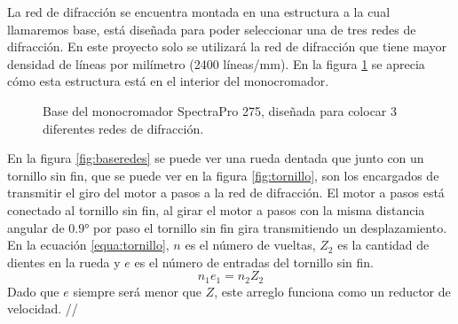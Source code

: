 La red de difracción se encuentra montada en una estructura a la cual llamaremos base, está diseñada para poder seleccionar una de tres redes de difracción. En este proyecto solo se utilizará la red de difracción que tiene mayor densidad de líneas por milímetro (2400 líneas/mm). En la figura \ref{fig:basered2} se aprecia cómo esta estructura está en el interior del monocromador.
\begin{figure}[h]
	\centering
	\caption{Base del monocromador SpectraPro 275, diseñada para colocar 3 diferentes redes de difracción.}
	\label{fig:basered2}
\end{figure}

En la figura \ref{fig:baseredes} se puede ver una rueda dentada que junto con un tornillo sin fin, que se puede ver en la figura \ref{fig:tornillo}, son los encargados de transmitir el giro del motor a pasos a la red de difracción. 
El motor a pasos está conectado al tornillo sin fin, al girar el motor a pasos con la misma distancia angular de $0.9°$ por paso el tornillo sin fin gira transmitiendo un desplazamiento. En la ecuación \ref{equa:tornillo}, $n$ es el número de vueltas, $Z_2$ es la cantidad de dientes en la rueda y $e$ es el número de entradas del tornillo sin fin.  
\begin{equation}
	n_1 e_1 = n_2 Z_2
	\label{equa:tornillo}
\end{equation}
Dado que $e$ siempre será menor que $Z$, este arreglo funciona como un reductor de velocidad.
//
\linebreak

